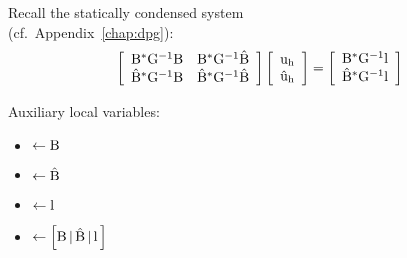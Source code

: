 \vskip 5pt
\begin{minipage}[t]{0.60\textwidth}
Recall the statically condensed system\\[-5pt]
(cf.~Appendix~\ref{chap:dpg}): \vspace{-10pt}
\[
	\left[ \begin{array}{cc}
		\mathrm{B^* G^{-1} B} & \mathrm{B^* G^{-1} \hat B} \\
		\mathrm{\hat B^* G^{-1} B} & \mathrm{\hat B^* G^{-1} \hat B} \\
	\end{array} \right]
	\left[ \begin{array}{c}
		\mathrm{u_h} \\
		\mathrm{\hat u_h} 
	\end{array} \right]
	=
	\left[ \begin{array}{c}
		\mathrm{B^* G^{-1} l} \\
		\mathrm{\hat B^* G^{-1} l}
	\end{array} \right]
\]
\end{minipage}
\begin{minipage}[t]{0.39\textwidth}
Auxiliary local variables: \vspace{-10pt}
\begin{itemize}
	\itemsep -8pt
	\item {} $\leftarrow \mathrm{B}$
	\item {} $\leftarrow \mathrm{\hat B}$
	\item {} $\leftarrow \mathrm{l}$
	\item {} $\leftarrow \left[ \mathrm{B \, | \, \hat B \, | \, l \, } \right]$
\end{itemize}
\end{minipage}

\vskip 5pt

